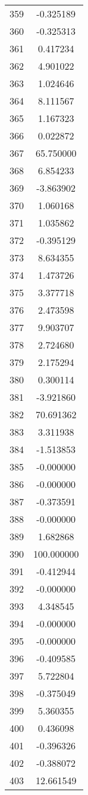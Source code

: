 \documentclass[12pt]{article}
\begin{document}
\begin{longtable}{@{}cc@{}}
359 & -0.325189 \\
360 & -0.325313 \\
361 & 0.417234 \\
362 & 4.901022 \\
363 & 1.024646 \\
364 & 8.111567 \\
365 & 1.167323 \\
366 & 0.022872 \\
367 & 65.750000 \\
368 & 6.854233 \\
369 & -3.863902 \\
370 & 1.060168 \\
371 & 1.035862 \\
372 & -0.395129 \\
373 & 8.634355 \\
374 & 1.473726 \\
375 & 3.377718 \\
376 & 2.473598 \\
377 & 9.903707 \\
378 & 2.724680 \\
379 & 2.175294 \\
380 & 0.300114 \\
381 & -3.921860 \\
382 & 70.691362 \\
383 & 3.311938 \\
384 & -1.513853 \\
385 & -0.000000 \\
386 & -0.000000 \\
387 & -0.373591 \\
388 & -0.000000 \\
389 & 1.682868 \\
390 & 100.000000 \\
391 & -0.412944 \\
392 & -0.000000 \\
393 & 4.348545 \\
394 & -0.000000 \\
395 & -0.000000 \\
396 & -0.409585 \\
397 & 5.722804 \\
398 & -0.375049 \\
399 & 5.360355 \\
400 & 0.436098 \\
401 & -0.396326 \\
402 & -0.388072 \\
403 & 12.661549 \\

\end{longtable}
\end{document}
